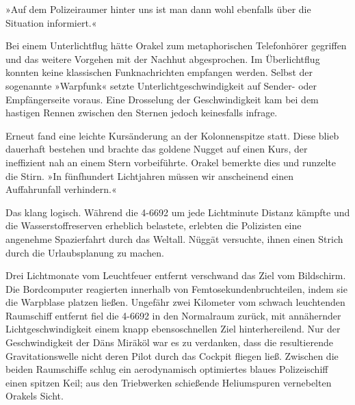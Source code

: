  »Auf dem Polizeiraumer hinter uns ist man dann wohl ebenfalls über die Situation informiert.«


Bei einem Unterlichtflug hätte Orakel zum metaphorischen Telefonhörer gegriffen und das weitere Vorgehen mit der Nachhut abgesprochen. Im Überlichtflug konnten keine klassischen Funknachrichten empfangen werden. Selbst der sogenannte »Warpfunk« setzte Unterlichtgeschwindigkeit auf Sender- oder Empfängerseite voraus. Eine Drosselung der Geschwindigkeit kam bei dem hastigen Rennen zwischen den Sternen jedoch keinesfalls infrage.

Erneut fand eine leichte Kursänderung an der Kolonnenspitze statt. Diese blieb dauerhaft bestehen und brachte das goldene Nugget auf einen Kurs, der ineffizient nah an einem Stern vorbeiführte. Orakel bemerkte dies und runzelte die Stirn. »In fünfhundert Lichtjahren müssen wir anscheinend einen Auffahrunfall verhindern.«


Das klang logisch. Während die 4-6692 um jede Lichtminute Distanz kämpfte und die Wasserstoffreserven erheblich belastete, erlebten die Polizisten eine angenehme Spazierfahrt durch das Weltall. Nüggät versuchte, ihnen einen Strich durch die Urlaubsplanung zu machen.

Drei Lichtmonate vom Leuchtfeuer entfernt verschwand das Ziel vom Bildschirm. Die Bordcomputer reagierten innerhalb von Femtosekundenbruchteilen, indem sie die Warpblase platzen ließen. Ungefähr zwei Kilometer vom schwach leuchtenden Raumschiff entfernt fiel die 4-6692 in den Normalraum zurück, mit annähernder Lichtgeschwindigkeit einem knapp ebensoschnellen Ziel hinterhereilend. Nur der Geschwindigkeit der Däns Miräköl war es zu verdanken, dass die resultierende Gravitationswelle nicht deren Pilot durch das Cockpit fliegen ließ. Zwischen die beiden Raumschiffe schlug ein aerodynamisch optimiertes blaues Polizeischiff einen spitzen Keil; aus den Triebwerken schießende Heliumspuren vernebelten Orakels Sicht.

